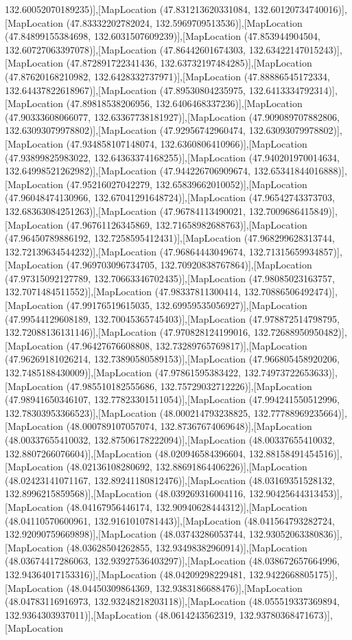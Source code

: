 132.60052070189235)],[MapLocation (47.831213620331084, 132.60120734740016)],[MapLocation (47.83332202782024, 132.5969709513536)],[MapLocation (47.84899155384698, 132.6031507609239)],[MapLocation (47.853944904504, 132.60727063397078)],[MapLocation (47.86442601674303, 132.63422147015243)],[MapLocation (47.872891722341436, 132.63732197484285)],[MapLocation (47.87620168210982, 132.6428332737971)],[MapLocation (47.88886545172334, 132.64437822618967)],[MapLocation (47.89530804235975, 132.6413334792314)],[MapLocation (47.89818538206956, 132.6406468337236)],[MapLocation (47.90333608066077, 132.63367738181927)],[MapLocation (47.909089707882806, 132.63093079978802)],[MapLocation (47.92956742960474, 132.63093079978802)],[MapLocation (47.934858107148074, 132.6360806410966)],[MapLocation (47.93899825983022, 132.64363374168255)],[MapLocation (47.940201970014634, 132.64998521262982)],[MapLocation (47.944226706909674, 132.65341844016888)],[MapLocation (47.95216027042279, 132.65839662010052)],[MapLocation (47.96048474130966, 132.67041291648724)],[MapLocation (47.96542743373703, 132.68363084251263)],[MapLocation (47.96784113490021, 132.7009686415849)],[MapLocation (47.96761126345869, 132.71658982688763)],[MapLocation (47.96450789886192, 132.7258595412431)],[MapLocation (47.968299628313744, 132.72139634544232)],[MapLocation (47.96864443049674, 132.71315659934857)],[MapLocation (47.969703096734705, 132.70920838767864)],[MapLocation (47.97315092127789, 132.70663346702435)],[MapLocation (47.98085023163757, 132.7071484511552)],[MapLocation (47.98337811300414, 132.70886506492474)],[MapLocation (47.99176519615035, 132.69959535056927)],[MapLocation (47.99544129608189, 132.70045365745403)],[MapLocation (47.978872514798795, 132.72088136131146)],[MapLocation (47.970828124199016, 132.72688950950482)],[MapLocation (47.96427676608808, 132.73289765769817)],[MapLocation (47.96269181026214, 132.73890580589153)],[MapLocation (47.966805458920206, 132.7485188430009)],[MapLocation (47.97861595383422, 132.74973722653633)],[MapLocation (47.985510182555686, 132.75729032712226)],[MapLocation (47.98941650346107, 132.77823301511054)],[MapLocation (47.994241550512996, 132.78303953366523)],[MapLocation (48.000214793238825, 132.77788969235664)],[MapLocation (48.000789107057074, 132.87367674069648)],[MapLocation (48.00337655410032, 132.87506178222094)],[MapLocation (48.00337655410032, 132.8807266076604)],[MapLocation (48.020946584396604, 132.88158491454516)],[MapLocation (48.02136108280692, 132.88691864406226)],[MapLocation (48.02423141071167, 132.89241180812476)],[MapLocation (48.03169351528132, 132.8996215859568)],[MapLocation (48.039269316004116, 132.90425644313453)],[MapLocation (48.04167956446174, 132.90940628444312)],[MapLocation (48.04110570600961, 132.9161010781443)],[MapLocation (48.041564793282724, 132.92090759669898)],[MapLocation (48.03743286053744, 132.93052063380836)],[MapLocation (48.03628504262855, 132.93498382960914)],[MapLocation (48.03674417286063, 132.93927536403297)],[MapLocation (48.038672657664996, 132.94364017153316)],[MapLocation (48.04209298229481, 132.9422668805175)],[MapLocation (48.04450309864369, 132.9383186688476)],[MapLocation (48.04783116916973, 132.93248218203118)],[MapLocation (48.055519337369894, 132.9364303937011)],[MapLocation (48.0614243562319, 132.93780368471673)],[MapLocation 